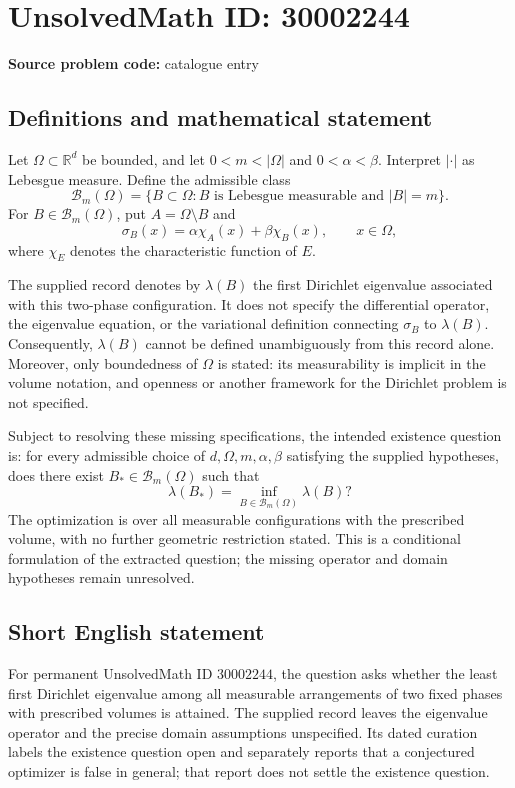 \documentclass[11pt]{article}
\newcommand{\R}{\mathbb{R}}
\begin{document}
\section*{UnsolvedMath ID: 30002244}
\textbf{Source problem code:} catalogue entry
\subsection{Definitions and mathematical statement}
Let $\Omega\subset\R^d$ be bounded, and let $0<m<|\Omega|$ and $0<\alpha<\beta$. Interpret $|\cdot|$ as Lebesgue measure. Define the admissible class
\[
\mathcal B_m(\Omega)=\{B\subset\Omega:B\text{ is Lebesgue measurable and }|B|=m\}.
\]
For $B\in\mathcal B_m(\Omega)$, put $A=\Omega\setminus B$ and
\[
\sigma_B(x)=\alpha\chi_A(x)+\beta\chi_B(x),\qquad x\in\Omega,
\]
where $\chi_E$ denotes the characteristic function of $E$.

The supplied record denotes by $\lambda(B)$ the first Dirichlet eigenvalue associated with this two-phase configuration. It does not specify the differential operator, the eigenvalue equation, or the variational definition connecting $\sigma_B$ to $\lambda(B)$. Consequently, $\lambda(B)$ cannot be defined unambiguously from this record alone. Moreover, only boundedness of $\Omega$ is stated: its measurability is implicit in the volume notation, and openness or another framework for the Dirichlet problem is not specified.

Subject to resolving these missing specifications, the intended existence question is: for every admissible choice of $d,\Omega,m,\alpha,\beta$ satisfying the supplied hypotheses, does there exist $B_*\in\mathcal B_m(\Omega)$ such that
\[
\lambda(B_*)=\inf_{B\in\mathcal B_m(\Omega)}\lambda(B)?
\]
The optimization is over all measurable configurations with the prescribed volume, with no further geometric restriction stated. This is a conditional formulation of the extracted question; the missing operator and domain hypotheses remain unresolved.
\subsection{Short English statement}
For permanent UnsolvedMath ID $30002244$, the question asks whether the least first Dirichlet eigenvalue among all measurable arrangements of two fixed phases with prescribed volumes is attained. The supplied record leaves the eigenvalue operator and the precise domain assumptions unspecified. Its dated curation labels the existence question open and separately reports that a conjectured optimizer is false in general; that report does not settle the existence question.
\end{document}
